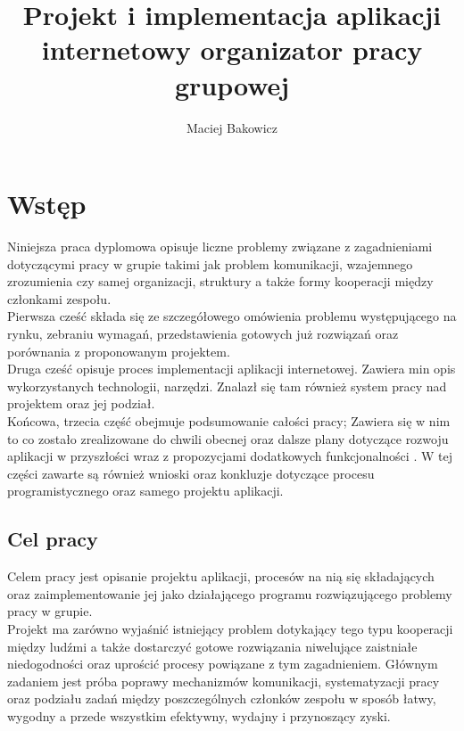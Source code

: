 \documentclass[eng,printmode]{mgr}
\title{Projekt i implementacja aplikacji internetowy organizator pracy grupowej }
\author{Maciej Bakowicz}
\begin{document}


\maketitle 

\tableofcontents 

\chapter{Wstęp}  
Niniejsza praca dyplomowa opisuje liczne problemy związane z zagadnieniami dotyczącymi pracy w grupie takimi jak problem komunikacji, wzajemnego zrozumienia czy samej organizacji, struktury a także formy kooperacji między członkami zespołu.
\\
Pierwsza cześć składa się ze szczegółowego omówienia problemu występującego na rynku, zebraniu wymagań, przedstawienia gotowych już rozwiązań oraz porównania z proponowanym projektem.
\\
Druga cześć opisuje proces implementacji aplikacji internetowej. Zawiera min opis wykorzystanych technologii, narzędzi. Znalazł się tam również system pracy nad projektem oraz jej podział.
\\
Końcowa, trzecia część obejmuje podsumowanie całości pracy; Zawiera się w nim to co zostało zrealizowane do chwili obecnej oraz dalsze plany dotyczące rozwoju aplikacji w przyszłości wraz z propozycjami dodatkowych funkcjonalności . W tej części zawarte są również wnioski oraz konkluzje dotyczące procesu programistycznego oraz samego projektu aplikacji.

\section{Cel pracy}
Celem pracy jest opisanie projektu aplikacji, procesów na nią się składających oraz zaimplementowanie jej jako działającego programu rozwiązującego problemy pracy w grupie.
\\
Projekt ma zarówno wyjaśnić istniejący problem dotykający tego typu kooperacji między ludźmi a także dostarczyć gotowe rozwiązania niwelujące zaistniałe niedogodności oraz uprościć procesy powiązane z tym zagadnieniem. Głównym zadaniem jest próba poprawy mechanizmów komunikacji, systematyzacji pracy oraz podziału zadań między poszczególnych członków zespołu w sposób łatwy, wygodny a przede wszystkim efektywny, wydajny i przynoszący zyski.
\end{document}
